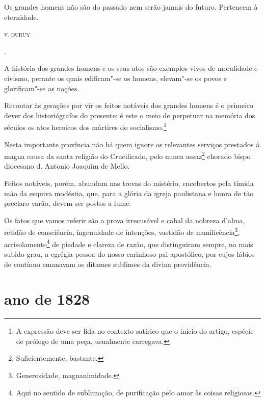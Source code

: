 \epigraph{Os grandes homens não são do passado
nem serão jamais do futuro. Pertencem à eternidade.}{\textsc{v.\,duruy}\footnotemark}.

A história dos grandes homens e os seus atos são exemplos vivos de
moralidade e civismo, perante os quais edificam"-se os homens, elevam"-se
os povos e glorificam"-se as nações.

Recontar às gerações por vir os feitos notáveis dos grandes homens é o
primeiro dever dos historiógrafos do presente; é este o meio de
perpetuar na memória dos séculos os atos heroicos dos mártires do
socialismo.\footnote{A expressão deve ser lida no contexto satírico
  que o início do artigo, espécie de prólogo de uma peça, usualmente
  carregava.}

Nesta importante província não há quem ignore os relevantes serviços
prestados à magna causa da santa religião do Crucificado, pelo nunca
assaz\footnote{Suficientemente, bastante.} chorado bispo diocesano d.
Antonio Joaquim de Mello.

Feitos notáveis, porém, abundam nas trevas do mistério, encobertos pela
tímida mão da esquiva modéstia, que, para a glória da igreja paulistana
e honra de tão preclaro varão, devem ser postos a lume.

Os fatos que vamos referir são a prova irrecusável e cabal da nobreza
d'alma, retidão de consciência, ingenuidade de intenções, vastidão de
munificência\footnote{Generosidade, magnanimidade.},
acrisolamento\footnote{Aqui no sentido de sublimação, de purificação
  pelo amor às coisas religiosas.} de piedade e clareza de razão, que
distinguiram sempre, no mais subido grau, a egrégia pessoa do nosso
carinhoso pai apostólico, por cujos lábios de contínuo emanavam os
ditames sublimes da divina providência.

\section*{ano de 1828}

